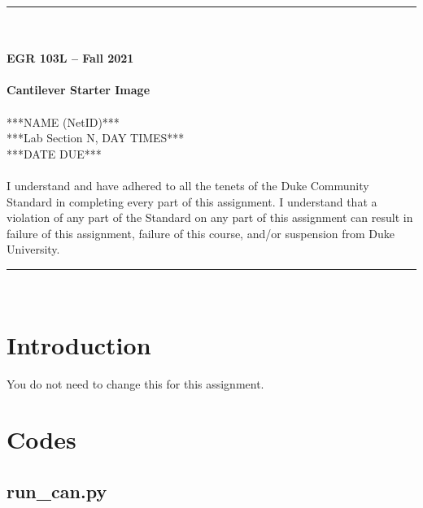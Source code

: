 \documentclass{article}
\begin{document}
\begin{center}
\rule{6.5in}{0.5mm}\\~\\
\textbf{\large EGR 103L -- Fall 2021}\\~\\
\textbf{\huge Cantilever Starter Image}\\~\\
***NAME (NetID)***\\
***Lab Section N, DAY TIMES***\\
***DATE DUE***\\~\\
{\small I understand and have adhered to all the tenets of the Duke Community Standard in completing every part of this assignment.  I understand that a violation of any part of the Standard on any part of this assignment can result in failure of this assignment, failure of this course, and/or suspension from Duke University.} 
\rule{6.5in}{0.5mm}\\
\end{center}
\tableofcontents
\listoffigures
\pagebreak
\section{Introduction}
You do not need to change this for this assignment.

\pagebreak

\appendix
\section{Codes}


\lstset{style=python103, language=python} 
\subsection{run\_can.py}


\pagebreak  %
\end{document}

